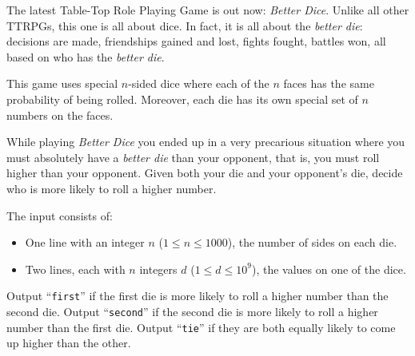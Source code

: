 

\newcommand{\maxn}{1000}

The latest Table-Top Role Playing Game is out now: \emph{Better Dice}. Unlike
all other TTRPGs, this one is all about dice. In fact, it is all about
the \emph{better die}: decisions are made, friendships gained and lost,
fights fought, battles won, all based on who has the \emph{better die}.

This game uses special $n$-sided dice where each of the $n$ faces has the same
probability of being rolled. Moreover, each die has its own special set of $n$
numbers on the faces.

While playing \emph{Better Dice} you ended up in a very precarious situation where
you must absolutely have a \emph{better die} than your opponent, that is, you
must roll higher than your opponent. Given both your die and your opponent's die,
decide who is more likely to roll a higher number.


\begin{Input}
    The input consists of:
    \begin{itemize}
        \item One line with an integer $n$ ($1\leq n\leq \maxn$), the number of sides on each die.
        \item Two lines, each with $n$ integers $d$ ($1 \leq d \leq 10^9$), the values on one of the dice.
    \end{itemize}
\end{Input}

\begin{Output}
    Output ``\texttt{first}'' if the first die is more likely to roll a higher number than the second die.
    Output ``\texttt{second}'' if the second die is more likely to roll a higher number than the first die.
    Output ``\texttt{tie}'' if they are both equally likely to come up higher than the other.
\end{Output}
